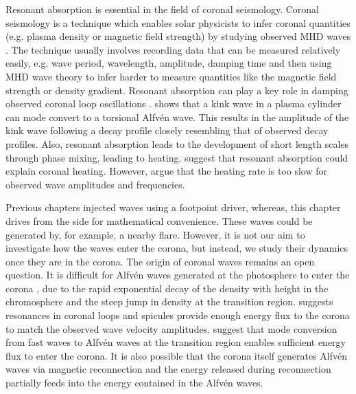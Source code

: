 Resonant absorption is essential in the field of coronal seismology. Coronal seismology is a technique which enables solar physicists to infer coronal quantities (e.g. plasma density or magnetic field strength) by studying observed MHD waves \citep{Nakariakov2005}. The technique usually involves recording data that can be measured relatively easily, e.g. wave period, wavelength, amplitude, damping time and then using MHD wave theory to infer harder to measure quantities like the magnetic field strength or density gradient. Resonant absorption can play a key role in damping observed coronal loop oscillations \citep{Nakariakov1999, Terradas2006}. \citet{Ruderman2002} shows that a kink wave in a plasma cylinder can mode convert to a torsional Alfv\'en wave. This results in the amplitude of the kink wave following a decay profile closely resembling that of observed decay profiles. Also, resonant absorption leads to the development of short length scales through phase mixing, leading to heating. \citet{Poedts1989,Ofman1995} suggest that resonant absorption could explain coronal heating. However, \citet{Prokopyszyn2019b} argue that the heating rate is too slow for observed wave amplitudes and frequencies.

Previous chapters injected waves using a footpoint driver, whereas, this chapter drives from the side for mathematical convenience.
These waves could be generated by, for example, a nearby flare. However, it is not our aim to investigate how the waves enter the corona, but instead, we study their dynamics once they are in the corona. The origin of coronal waves remains an open question. It is difficult for Alfv\'en waves generated at the photosphere to enter the corona \citep{Cranmer2005}, due to the rapid exponential decay of the density with height in the chromosphere and the steep jump in density at the transition region. \citet{Hollweg1984b} suggests resonances in coronal loops and spicules provide enough energy flux to the corona to match the observed wave velocity amplitudes. \citet{Cally2011,Hansen2012} suggest that mode conversion from fast waves to Alfv\'en waves at the transition region enables sufficient energy flux to enter the corona. It is also possible that the corona itself generates Alfv\'en waves via magnetic reconnection \citep{Cranmer2018} and the energy released during reconnection partially feeds into the energy contained in the Alfv\'en waves.

